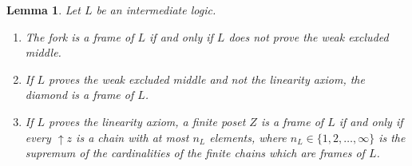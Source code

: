 \documentclass[11pt]{amsart}
\newtheorem{lem}[thm]{Lemma}
\theoremstyle{definition}
\begin{document}
\begin{lem}\label{lem:frames}
Let $L$ be an intermediate logic.
\begin{enumerate}
\item[(a)] The fork is a frame of $L$ if and only if $L$ does not
prove the weak excluded middle.
\item[(b)] If $L$ proves the weak excluded middle and not the linearity
axiom, the diamond is a frame of $L$.
\item[(c)] If $L$ proves the linearity axiom, a finite poset $Z$ is a
frame of $L$ if and only if every $\uparrow\!z$ is a chain with at most
$n_L$ elements, where $n_L\in\{1,2,\dots,\infty\}$ is the supremum of
the cardinalities of the finite chains which are frames of $L$.
\end{enumerate}
\end{lem}
\end{document}
